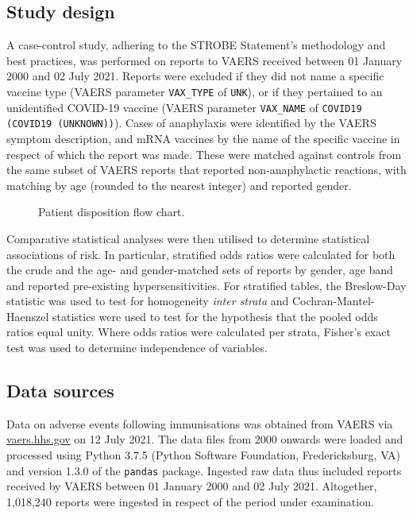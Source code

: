 \documentclass{article}
\begin{document}
\subsection{Study design}

A case-control study, adhering to the STROBE Statement's methodology and best practices,\cite{von2014strengthening} was performed on reports to VAERS received between 01 January 2000 and 02 July 2021.
Reports were excluded if they did not name a specific vaccine type (VAERS parameter \texttt{VAX\_TYPE} of \texttt{UNK}), or if they pertained to an unidentified COVID-19 vaccine (VAERS parameter \texttt{VAX\_NAME} of \texttt{COVID19 (COVID19 (UNKNOWN))}).
Cases of anaphylaxis were identified by the VAERS symptom description, and mRNA vaccines by the name of the specific vaccine in respect of which the report was made.
These were matched against controls from the same subset of VAERS reports that reported non-anaphylactic reactions, with matching by age (rounded to the nearest integer) and reported gender.

\begin{figure}
    \centering
    
    \caption{Patient disposition flow chart.}
    \label{fig:patient_disposition}
\end{figure}

Comparative statistical analyses were then utilised to determine statistical associations of risk.
In particular, stratified odds ratios were calculated for both the crude and the age- and gender-matched sets of reports by gender, age band and reported pre-existing hypersensitivities.
For stratified tables, the Breslow-Day statistic was used to test for homogeneity \textit{inter strata} and Cochran-Mantel-Haenszel statistics were used to test for the hypothesis that the pooled odds ratios equal unity.
Where odds ratios were calculated per strata, Fisher's exact test was used to determine independence of variables.

\subsection{Data sources}

Data on adverse events following immunisations was obtained from VAERS via \url{vaers.hhs.gov} on 12 July 2021.
The data files from 2000 onwards were loaded and processed using Python 3.7.5 (Python Software Foundation, Fredericksburg, VA) and version 1.3.0 of the \texttt{pandas} package.\cite{mckinney2011pandas}
Ingested raw data thus included reports received by VAERS between 01 January 2000 and 02 July 2021.
Altogether, 1,018,240 reports were ingested in respect of the period under examination.
\end{document}
